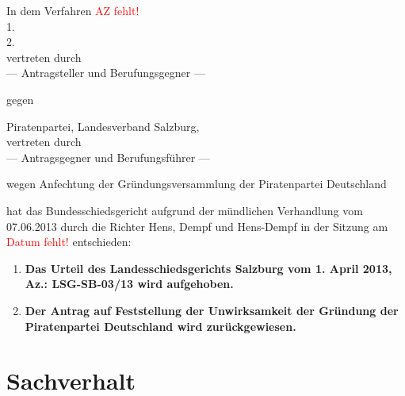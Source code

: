%
%



\newcommand{\Aktenzeichen}{\textcolor{red}{AZ fehlt!}}
\newcommand{\Datum}       {\textcolor{red}{Datum fehlt!}}
\newcommand{\Titel}       {\textcolor{red}{Urteil/Beschluss} zu {\Aktenzeichen}}



In dem Verfahren \Aktenzeichen\\

1. \\[0.1em]
2. \\[0.1em]
vertreten durch \\[0.1em]
--- Antragsteller und Berufungsgegner ---

gegen

Piratenpartei, Landesverband Salzburg, \\[0.1em]
vertreten durch \\[0.1em]
--- Antragsgegner und Berufungsführer ---

wegen Anfechtung der Gründungsversammlung der Piratenpartei Deutschland

hat das Bundesschiedsgericht aufgrund der mündlichen Verhandlung vom 07.06.2013 durch die Richter Hens, Dempf und Hens-Dempf in der Sitzung am {\Datum} entschieden:

\begin{enumerate}
\item \textbf{Das Urteil des Landesschiedsgerichts Salzburg vom 1. April 2013, Az.: LSG-SB-03/13 wird aufgehoben.}
\item \textbf{Der Antrag auf Feststellung der Unwirksamkeit der Gründung der Piratenpartei Deutschland wird zurückgewiesen.}
\end{enumerate}

\section*{Sachverhalt}

